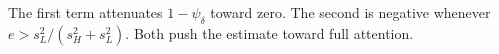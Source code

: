The first term attenuates $1-\psi_\delta$ toward zero. The second is negative whenever $e>s_L^2/(s_H^2+s_L^2)$. Both push the estimate toward full attention.
